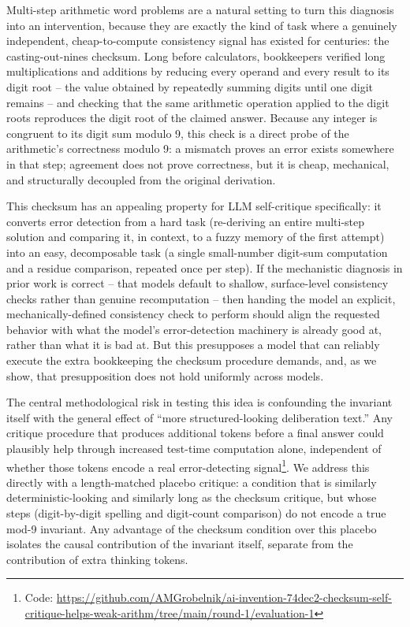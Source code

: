 \documentclass[11pt,letterpaper]{article}
\begin{document}
Multi-step arithmetic word problems are a natural setting to turn this diagnosis into an intervention, because they are exactly the kind of task where a genuinely independent, cheap-to-compute consistency signal has existed for centuries: the casting-out-nines checksum. Long before calculators, bookkeepers verified long multiplications and additions by reducing every operand and every result to its digit root -- the value obtained by repeatedly summing digits until one digit remains -- and checking that the same arithmetic operation applied to the digit roots reproduces the digit root of the claimed answer. Because any integer is congruent to its digit sum modulo 9, this check is a direct probe of the arithmetic's correctness modulo 9: a mismatch proves an error exists somewhere in that step; agreement does not prove correctness, but it is cheap, mechanical, and structurally decoupled from the original derivation.

This checksum has an appealing property for LLM self-critique specifically: it converts error detection from a hard task (re-deriving an entire multi-step solution and comparing it, in context, to a fuzzy memory of the first attempt) into an easy, decomposable task (a single small-number digit-sum computation and a residue comparison, repeated once per step). If the mechanistic diagnosis in prior work is correct -- that models default to shallow, surface-level consistency checks rather than genuine recomputation -- then handing the model an explicit, mechanically-defined consistency check to perform should align the requested behavior with what the model's error-detection machinery is already good at, rather than what it is bad at. But this presupposes a model that can reliably execute the extra bookkeeping the checksum procedure demands, and, as we show, that presupposition does not hold uniformly across models.

The central methodological risk in testing this idea is confounding the invariant itself with the general effect of ``more structured-looking deliberation text.'' Any critique procedure that produces additional tokens before a final answer could plausibly help through increased test-time computation alone, independent of whether those tokens encode a real error-detecting signal\footnote{Code: \url{https://github.com/AMGrobelnik/ai-invention-74dec2-checksum-self-critique-helps-weak-arithm/tree/main/round-1/evaluation-1}}. We address this directly with a length-matched placebo critique: a condition that is similarly deterministic-looking and similarly long as the checksum critique, but whose steps (digit-by-digit spelling and digit-count comparison) do not encode a true mod-9 invariant. Any advantage of the checksum condition over this placebo isolates the causal contribution of the invariant itself, separate from the contribution of extra thinking tokens.
\end{document}
